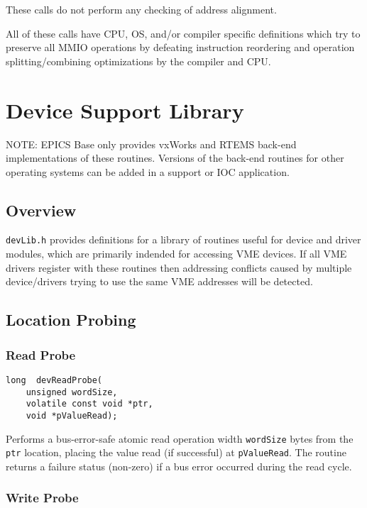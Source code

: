 These calls do not perform any checking of address alignment.

All of these calls have CPU, OS, and/or compiler specific definitions which
try to preserve all MMIO operations by defeating instruction reordering
and operation splitting/combining optimizations by the compiler and CPU.

\section{ Device Support Library}

NOTE: EPICS Base only provides vxWorks and RTEMS back-end implementations of these routines. Versions of the 
back-end routines for other operating systems can be added in a support or IOC application.

\subsection{Overview}

\verb|devLib.h| provides definitions for a library of routines useful for device and driver modules, which are primarily 
indended for accessing VME devices. If all VME drivers register with these routines  then  addressing conflicts caused by 
multiple device/drivers trying to use the same VME addresses will be detected.

\subsection{Location Probing}

\subsubsection{Read Probe}

\begin{verbatim}
long  devReadProbe(
    unsigned wordSize,
    volatile const void *ptr,
    void *pValueRead);
\end{verbatim}

Performs a bus-error-safe atomic read operation width \verb|wordSize| bytes from the \verb|ptr| location, placing the value read (if 
successful) at \verb|pValueRead|. The routine returns a failure status (non-zero) if a bus error occurred during the read cycle.

\subsubsection{Write Probe}

